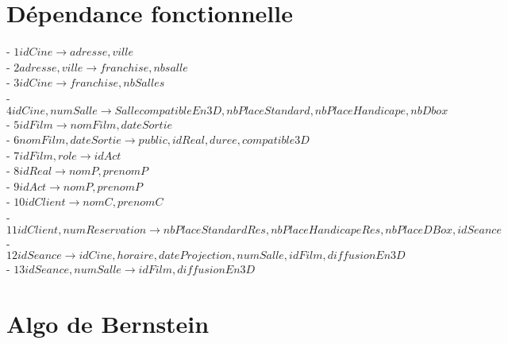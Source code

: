 \documentclass[a4paper,sffamily,12pt]{article}
\begin{document}
%			
%				
%			
			
			\section{Dépendance fonctionnelle}
			
				\noindent- $ 1 idCine \rightarrow adresse, ville$ \\
				- $2 adresse, ville \rightarrow franchise, nbsalle$ \\
				- $ 3 idCine \rightarrow franchise, nbSalles$ \\
				- $ 4 idCine, numSalle \rightarrow SallecompatibleEn3D, nbPlaceStandard, nbPlaceHandicape,nbDbox$ \\
		 		- $ 5 idFilm \rightarrow nomFilm, dateSortie$ \\
				- $ 6 nomFilm, dateSortie \rightarrow public, idReal, duree, compatible3D$ \\
				- $ 7idFilm, role \rightarrow  idAct$ \\
				- $ 8 idReal \rightarrow nomP, prenomP $\\
				- $ 9 idAct \rightarrow nomP, prenomP $\\
				- $ 10 idClient \rightarrow nomC, prenomC$ \\
				- $11 idClient, numReservation \rightarrow nbPlaceStandardRes, nbPlaceHandicapeRes, nbPlaceDBox, idSeance$\\
				- $12 idSeance \rightarrow idCine, horaire, dateProjection, numSalle, idFilm, diffusionEn3D$\\
				- $ 13 idSeance, numSalle \rightarrow idFilm, diffusionEn3D$ \\ 
				
				\section{Algo de Bernstein}
		
\end{document}
